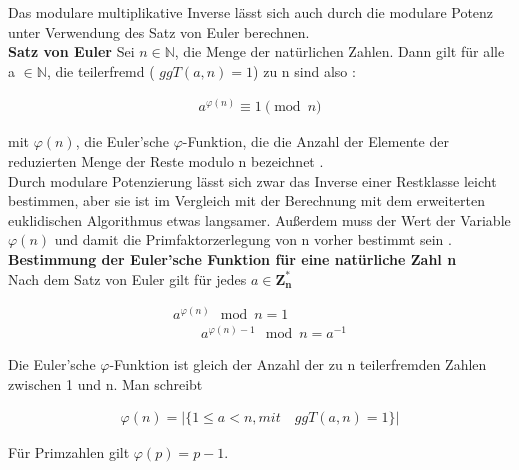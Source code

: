 Das modulare multiplikative Inverse lässt sich auch durch die modulare Potenz unter Verwendung des Satz von Euler berechnen. \\
\textbf{Satz von Euler}
Sei \(n \in \mathbb{N}\), die Menge der natürlichen Zahlen. Dann gilt
für alle a \(\in \mathbb{N}\), die teilerfremd ( $ ggT(a, n) = 1 $) zu n sind also \cite{langMIE}: \\

\begin{ceqn}
\begin{align*}
            a^{\varphi(n)} \equiv 1 \pmod n
\end{align*}
\end{ceqn}
mit $ \varphi(n)$, die Euler’sche $\varphi$-Funktion, die die Anzahl der Elemente der
reduzierten Menge der Reste modulo n bezeichnet \cite{damer}. \\

Durch modulare Potenzierung lässt sich zwar das Inverse einer Restklasse
leicht bestimmen, aber sie ist im Vergleich mit der Berechnung mit dem
erweiterten euklidischen Algorithmus etwas langsamer. Außerdem muss der Wert der Variable \(\varphi(n)\) und damit die  Primfaktorzerlegung von n vorher bestimmt sein \cite{langMIE}.
\\

\textbf{Bestimmung der Euler'sche Funktion für eine natürliche Zahl n } \\

Nach dem Satz von Euler gilt für jedes \(a \in \mathbf{Z^*_n} \)\\

\begin{ceqn}
\begin{align*}
            a^{\varphi(n)} \mod n = 1 \\
    \qquad  a^{\varphi(n) - 1} \mod n = a^{-1}
\end{align*}
\end{ceqn}

Die Euler'sche $\varphi$-Funktion ist gleich der Anzahl der zu n
teilerfremden Zahlen zwischen 1 und n. Man schreibt \\

\begin{ceqn}
\begin{align*}
         \varphi(n) = |\{ 1 \leq a < n, mit \quad ggT(a, n) = 1 \}|
\end{align*}
\end{ceqn}

Für Primzahlen gilt \(\varphi(p) = p - 1 \). \\

